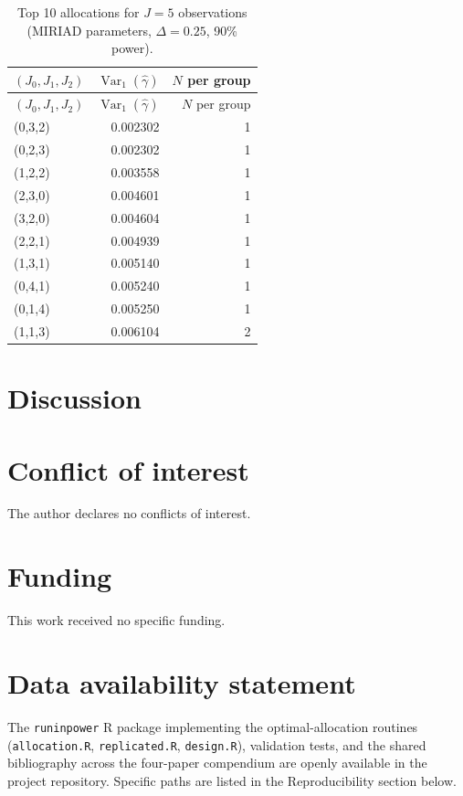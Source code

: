 \documentclass[
  11pt,
]{article}
\begin{document}
\begin{longtable}[]{@{}lrr@{}}
\caption{Top 10 allocations for \(J=5\) observations (MIRIAD parameters,
\(\Delta=0.25\), 90\% power).}\tabularnewline
\toprule\noalign{}
\((J_0, J_1, J_2)\) & \(\mathop{\mathrm{Var}}_1(\hat\gamma)\) & \(N\)
per group \\
\midrule\noalign{}
\endfirsthead
\toprule\noalign{}
\((J_0, J_1, J_2)\) & \(\mathop{\mathrm{Var}}_1(\hat\gamma)\) & \(N\)
per group \\
\midrule\noalign{}
\endhead
\bottomrule\noalign{}
\endlastfoot
(0,3,2) & 0.002302 & 1 \\
(0,2,3) & 0.002302 & 1 \\
(1,2,2) & 0.003558 & 1 \\
(2,3,0) & 0.004601 & 1 \\
(3,2,0) & 0.004604 & 1 \\
(2,2,1) & 0.004939 & 1 \\
(1,3,1) & 0.005140 & 1 \\
(0,4,1) & 0.005240 & 1 \\
(0,1,4) & 0.005250 & 1 \\
(1,1,3) & 0.006104 & 2 \\
\end{longtable}

\section{Discussion}\label{discussion}

\section{Conflict of interest}\label{conflict-of-interest}

The author declares no conflicts of interest.

\section{Funding}\label{funding}

This work received no specific funding.

\section{Data availability statement}\label{data-availability-statement}

The \texttt{runinpower} R package implementing the optimal-allocation
routines (\texttt{allocation.R}, \texttt{replicated.R},
\texttt{design.R}), validation tests, and the shared bibliography across
the four-paper compendium are openly available in the project
repository. Specific paths are listed in the Reproducibility section
below.
\end{document}
